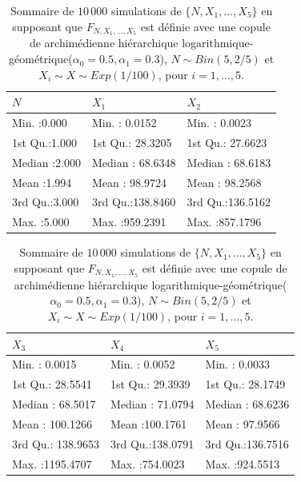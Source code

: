 \documentclass{article}
\begin{document}
	\begin{table}[H]
		\centering
		\begin{tabular}{lll}
			\hline
			$N$ &       $X_1$ &       $X_2$        \\ 
			\hline
			  Min.   :0.000   & Min.   :  0.0152   & Min.   :  0.0023      \\ 
			  1st Qu.:1.000   & 1st Qu.: 28.3205   & 1st Qu.: 27.6623      \\ 
			  Median :2.000   & Median : 68.6348   & Median : 68.6183       \\ 
			  Mean   :1.994   & Mean   : 98.9724   & Mean   : 98.2568      \\ 
			  3rd Qu.:3.000   & 3rd Qu.:138.8460   & 3rd Qu.:136.5162       \\ 
			  Max.   :5.000   & Max.   :959.2391   & Max.   :857.1796      \\
			\hline
		\end{tabular}
		\begin{tabular}{lll}
			\hline
			$X_3$ &       $X_4$ &       $X_5$ \\ 
			\hline
			  Min.   :   0.0015   & Min.   :  0.0052   & Min.   :  0.0033   \\ 
			  1st Qu.:  28.5541   & 1st Qu.: 29.3939   & 1st Qu.: 28.1749   \\ 
			  Median :  68.5017   & Median : 71.0794   & Median : 68.6236   \\ 
			  Mean   : 100.1266   & Mean   :100.1761   & Mean   : 97.9566   \\ 
			  3rd Qu.: 138.9653   & 3rd Qu.:138.0791   & 3rd Qu.:136.7516   \\ 
			  Max.   :1195.4707   & Max.   :754.0023   & Max.   :924.5513   \\ 
			\hline
		\end{tabular}
		\caption[Sommaire des données simulées pour le scénario \ref{scenario_log_geo}]{Sommaire de $10\,000$ simulations de $\{N, X_1, \dots, X_5\}$ en supposant que $F_{N,X_1,\dots, X_5}$ est définie avec une copule de archimédienne hiérarchique logarithmique-géométrique($\alpha_0=0.5, \alpha_1 = 0.3$), $N \sim Bin(5, 2/5)$ et $X_i \sim X \sim Exp(1/100)$, pour $i=1,\dots, 5$.}
		\label{tbl_sommaire_log_geo}
	\end{table}
	
\end{document}
